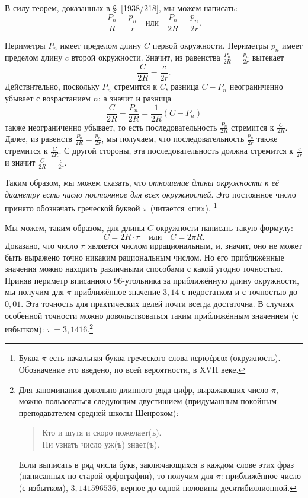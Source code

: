 В силу теорем, доказанных в §~\ref{1938/218}, мы можем написать:
\[\frac{P_n}{R}=\frac{p_n}{r}
\quad\text{или}\quad
\frac{P_n}{2R}=\frac{p_n}{2r}.\]

Периметры $P_n$ имеет пределом длину $C$ первой окружности.
Периметры $p_n$ имеет пределом длину $c$ второй окружности.
Значит, из равенства $\frac{P_n}{2R}=\frac{p_n}{2r}$ вытекает
\[\frac{C}{2R}=\frac{c}{2r}.\]
Действительно, поскольку $P_n$ стремится к $C$,
разница $C-P_n$ неограниченно убывает с возрастанием $n$;
а значит и разница
\[\frac{C}{2R}-\frac{P_n}{2R}=\frac{1}{2R}(C-P_n)\]
также неограниченно убывает, то есть последовательность $\frac{P_n}{2R}$ стремится к $\frac{C}{2R}$.
Далее, из равенств $\frac{P_n}{2R}=\frac{p_n}{2r}$,
мы получаем, что последовательность $\frac{p_n}{2r}$ также стремится к $\frac{C}{2R}$.
С другой стороны, эта последовательность должна стремится к $\frac{c}{2r}$ и значит $\frac{C}{2R}=\frac{c}{2r}$.

Таким образом, мы можем сказать, что \emph{отношение длины окружности к её диаметру есть число постоянное для всех окружностей}. 
Это постоянное число принято обозначать греческой буквой $\pi$ (читается «пи»).%
\footnote{Буква $\pi$ есть начальная буква греческого слова \textgreek{περιφέρεια} (окружность).
Обозначение это введено, по всей вероятности, в XVII веке.
}

Мы можем, таким образом, для длины $C$ окружности написать такую формулу:
\[C=2R\cdot\pi
\quad\text{или}\quad
C=2\pi R.
\]
Доказано, что число $\pi$ является числом иррациональным, и, значит, оно не может быть выражено точно никаким рациональным числом.
Но его приближённые значения можно находить различными способами с какой угодно точностью.
Приняв периметр вписанного 96-угольника за приближённую длину окружности, мы получим для $\pi$ приближённое значение $3{,}14$ с недостатком и с точностью до $0{,}01$.
Эта точность для практических целей почти всегда достаточна.
В случаях особенной точности можно довольствоваться таким приближённым значением (с избытком):
$\pi = 3{,}1416$.\footnote{Для запоминания довольно длинного ряда цифр, выражающих число $\pi$, можно пользоваться следующим  двустишием (придуманным покойным преподавателем средней школы Шенроком):
\begin{verse}
Кто и шутя и скоро пожелает(ъ).\\
Пи узнать число уж(ъ) знает(ъ).
\end{verse}
Если выписать в ряд числа букв, заключающихся в каждом слове этих фраз (написанных по старой орфографии), то получим для $\pi$:
приближённое число (с избытком), $3{,}141596536$, верное до одной половины десятибиллионной.}%

